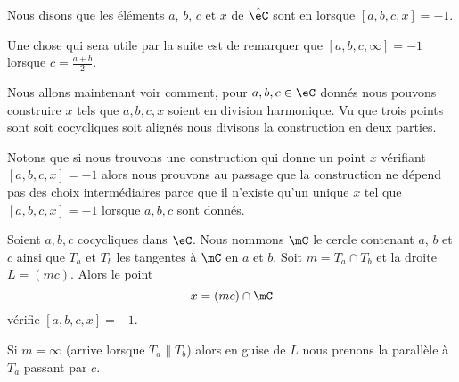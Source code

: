 \begin{definition}
	Nous disons que les éléments \( a\), \( b\), \( c\) et \( x\) de \( \hat \eC\) sont en  lorsque \( [a,b,c,x]=-1\).
\end{definition}

\begin{normaltext}      \label{NORMooUWYDooAZTTWu}
	Une chose qui sera utile par la suite est de remarquer que \( [a,b,c,\infty]=-1\) lorsque \( c=\frac{ a+b }{ 2 }\).
\end{normaltext}

Nous allons maintenant voir comment, pour \( a,b,c\in \eC\) donnés nous pouvons construire \( x\) tels que \( a,b,c,x\) soient en division harmonique. Vu que trois points sont soit cocycliques soit alignés nous divisons la construction en deux parties.

Notons que si nous trouvons une construction qui donne un point \( x\) vérifiant \( [a,b,c,x]=-1\) alors nous prouvons au passage que la construction ne dépend pas des choix intermédiaires parce que il n'existe qu'un unique \( x\) tel que \( [a,b,c,x]=-1\) lorsque \( a,b,c\) sont donnés.

\begin{lemma}     \label{LEMooAEDTooKsUoPw}
	Soient \( a,b,c\) cocycliques dans \( \eC\). Nous nommons \( \mC\) le cercle contenant \( a\), \( b\) et \( c\) ainsi que \( T_a\) et \( T_b\) les tangentes à \( \mC\) en \( a\) et \( b\). Soit \( m=T_a\cap T_b\) et la droite \( L=(mc)\). Alors le point
	\begin{equation}
		x=(mc)\cap \mC
	\end{equation}
	vérifie \( [a,b,c,x]=-1\).

	Si \( m=\infty\) (arrive lorsque \( T_a\parallel T_b\)) alors en guise de \( L\) nous prenons la parallèle à \( T_a\) passant par \( c\).
\end{lemma}

